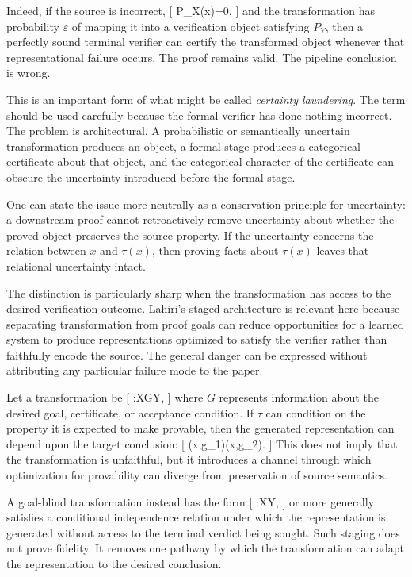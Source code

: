 \documentclass[11pt]{article}
\begin{document}
Indeed, if the source is incorrect,
[
P_X(x)=0,
]
and the transformation has probability $\varepsilon$ of mapping it into a verification object satisfying $P_Y$, then a perfectly sound terminal verifier can certify the transformed object whenever that representational failure occurs. The proof remains valid. The pipeline conclusion is wrong.

This is an important form of what might be called \emph{certainty laundering}. The term should be used carefully because the formal verifier has done nothing incorrect. The problem is architectural. A probabilistic or semantically uncertain transformation produces an object, a formal stage produces a categorical certificate about that object, and the categorical character of the certificate can obscure the uncertainty introduced before the formal stage.

One can state the issue more neutrally as a conservation principle for uncertainty: a downstream proof cannot retroactively remove uncertainty about whether the proved object preserves the source property. If the uncertainty concerns the relation between $x$ and $\tau(x)$, then proving facts about $\tau(x)$ leaves that relational uncertainty intact.

The distinction is particularly sharp when the transformation has access to the desired verification outcome. Lahiri's staged architecture is relevant here because separating transformation from proof goals can reduce opportunities for a learned system to produce representations optimized to satisfy the verifier rather than faithfully encode the source. The general danger can be expressed without attributing any particular failure mode to the paper.

Let a transformation be
[
\tau:X\times G\rightarrow Y,
]
where $G$ represents information about the desired goal, certificate, or acceptance condition. If $\tau$ can condition on the property it is expected to make provable, then the generated representation can depend upon the target conclusion:
[
\tau(x,g_1)\neq\tau(x,g_2).
]
This does not imply that the transformation is unfaithful, but it introduces a channel through which optimization for provability can diverge from preservation of source semantics.

A goal-blind transformation instead has the form
[
\tau:X\rightarrow Y,
]
or more generally satisfies a conditional independence relation under which the representation is generated without access to the terminal verdict being sought. Such staging does not prove fidelity. It removes one pathway by which the transformation can adapt the representation to the desired conclusion.
\end{document}
